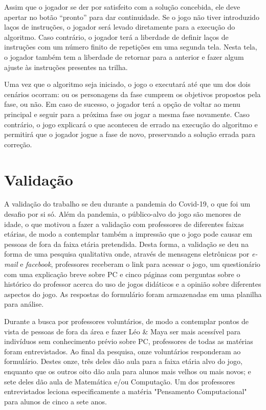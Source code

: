 \documentclass[conference]{IEEEtran}
\begin{document}
Assim que o jogador se der por satisfeito com a solução concebida, ele deve apertar no botão ``pronto'' para dar continuidade. Se o jogo não tiver introduzido laços de instruções, o jogador será levado diretamente para a execução do algoritmo. Caso contrário, o jogador terá a liberdade de definir laços de instruções com um número finito de repetições em uma segunda tela. Nesta tela, o jogador também tem a liberdade de retornar para a anterior e fazer algum ajuste às instruções presentes na trilha.

Uma vez que o algoritmo seja iniciado, o jogo o executará até que um dos dois cenários ocorram: ou os personagens da fase cumprem os objetivos propostos pela fase, ou não. Em caso de sucesso, o jogador terá a opção de voltar ao menu principal e seguir para a próxima fase ou jogar a mesma fase novamente. Caso contrário, o jogo explicará o que aconteceu de errado na execução do algoritmo e permitirá que o jogador jogue a fase de novo, preservando a solução errada para correção.

\section{Validação}

A validação do trabalho se deu durante a pandemia do Covid-19, o que foi um desafio por si só. Além da pandemia, o público-alvo do jogo são menores de idade, o que motivou a fazer a validação com professores de diferentes faixas etárias, de modo a contemplar também a impressão que o jogo pode causar em pessoas de fora da faixa etária pretendida. Desta forma, a validação se deu na forma de uma pesquisa qualitativa onde, através de mensagens eletrônicas por \textit{e-mail} e \textit{facebook}, professores receberam o link para acessar o jogo, um questionário com uma explicação breve sobre PC e cinco páginas com perguntas sobre o histórico do professor acerca do uso de jogos didáticos e a opinião sobre diferentes aspectos do jogo. As respostas do formulário foram armazenadas em uma planilha para análise.

Durante a busca por professores voluntários, de modo a contemplar pontos de vista de pessoas de fora da área e fazer Léo \& Maya ser mais acessível para indivíduos sem conhecimento prévio sobre PC, professores de todas as matérias foram entrevistados. Ao final da pesquisa, onze voluntários responderam ao formulário. Destes onze, três deles dão aula para a faixa etária alvo do jogo, enquanto que os outros oito dão aula para alunos mais velhos ou mais novos; e sete deles dão aula de Matemática e/ou Computação. Um dos professores entrevistados leciona especificamente a matéria "Pensamento Computacional" para alunos de cinco a sete anos.
\end{document}
